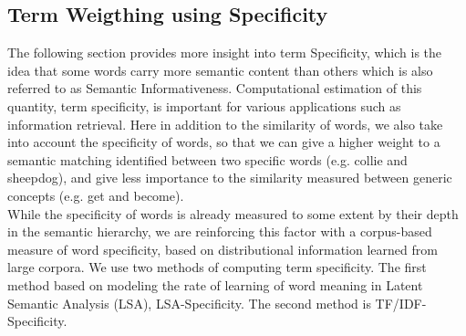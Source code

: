 \subsection{Term Weigthing using Specificity}
The following section provides more insight into term Specificity, which is the idea that some words carry more semantic content than others which is also referred to as Semantic Informativeness. Computational estimation of this quantity, term specificity, is important for various applications such as information retrieval. Here in addition to the similarity of words, we also take into account the specificity of words, so that we can give a higher weight to a semantic matching identified between two specific words (e.g. collie and sheepdog), and give less importance to the similarity measured between generic concepts (e.g. get and become).\\
 While the specificity of words is already measured to some extent by their depth in the semantic hierarchy, we are reinforcing this factor with a corpus-based measure of word specificity, based on distributional information learned from large corpora.
We use two methods of computing term specificity. The first method based on modeling the rate of learning of word meaning in Latent Semantic Analysis (LSA), LSA-Specificity. The second method is TF/IDF-Specificity\citep{spec}.

